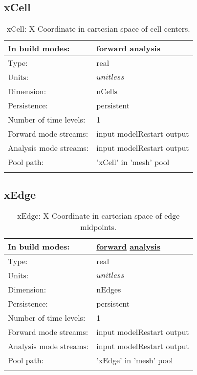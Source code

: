 \subsection[xCell]{xCell}
\label{subsec:var_sec_mesh_xCell}
\begin{center}
\begin{longtable}{| p{2.0in} | p{4.0in} |}
        \hline 
        In build modes: & \hyperref[subsec:forward_var_tab_mesh]{forward} \hyperref[subsec:analysis_var_tab_mesh]{analysis} \\
        \hline 
        Type: & real \\
        \hline 
        Units: & $unitless$ \\
        \hline 
        Dimension: & nCells \\
        \hline 
        Persistence: & persistent \\
        \hline 
        Number of time levels: & 1 \\
        \hline 
		 Forward mode streams: &  input modelRestart output \\
        \hline 
		 Analysis mode streams: &  input modelRestart output \\
        \hline 
            Pool path: & 'xCell' in 'mesh' pool
 \\
		 \hline 
    \caption{xCell: X Coordinate in cartesian space of cell centers.}
\end{longtable}
\end{center}
\subsection[xEdge]{xEdge}
\label{subsec:var_sec_mesh_xEdge}
\begin{center}
\begin{longtable}{| p{2.0in} | p{4.0in} |}
        \hline 
        In build modes: & \hyperref[subsec:forward_var_tab_mesh]{forward} \hyperref[subsec:analysis_var_tab_mesh]{analysis} \\
        \hline 
        Type: & real \\
        \hline 
        Units: & $unitless$ \\
        \hline 
        Dimension: & nEdges \\
        \hline 
        Persistence: & persistent \\
        \hline 
        Number of time levels: & 1 \\
        \hline 
		 Forward mode streams: &  input modelRestart output \\
        \hline 
		 Analysis mode streams: &  input modelRestart output \\
        \hline 
            Pool path: & 'xEdge' in 'mesh' pool
 \\
		 \hline 
    \caption{xEdge: X Coordinate in cartesian space of edge midpoints.}
\end{longtable}
\end{center}
